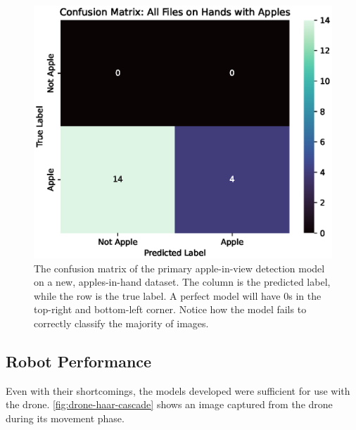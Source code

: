 \begin{figure}[!htb]
    \centering
    \includegraphics[width=\columnwidth,keepaspectratio]
    {./figures/confusion_matrix_All_Files_on_Hands_with_Apples}
    \caption{
        The confusion matrix of the primary apple-in-view detection model on a new, apples-in-hand dataset.
        The column is the predicted label, while the row is the true label.
        A perfect model will have 0s in the top-right and bottom-left corner.
        Notice how the model fails to correctly classify the majority of images.
    }
    \label{fig:apple-in-hand-confusion-matrix}
\end{figure}

\subsection{Robot Performance}\label{subsec:robot-performance}
Even with their shortcomings, the models developed were sufficient for use with the drone.
\autoref{fig:drone-haar-cascade} shows an image captured from the drone during its movement phase.

